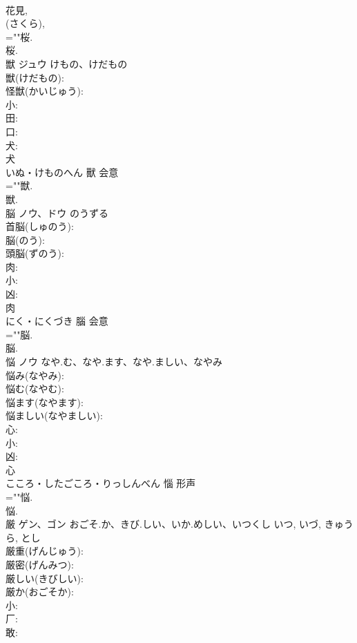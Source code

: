 \documentclass[8pt]{extreport}
\begin{document}
\begin{CJK}{UTF8}{min}
\\	花見, 
\\	(さくら), 
\\	=""桜.
\\	桜.
\\	獣	ジュウ	けもの、けだもの		
\\	獣(けだもの): 
\\	怪獣(かいじゅう): 
\\	小: 
\\	田: 
\\	口: 
\\	犬: 
\\	犬	
\\	いぬ・けものへん	獸	会意 
\\	=""獣.
\\	獣.
\\	脳	ノウ、ドウ	のうずる		
\\	首脳(しゅのう): 
\\	脳(のう): 
\\	頭脳(ずのう): 
\\	肉: 
\\	小: 
\\	凶: 
\\	肉	
\\	にく・にくづき	腦	会意 
\\	=""脳.
\\	脳.
\\	悩	ノウ	なや.む、なや.ます、なや.ましい、なやみ		
\\	悩み(なやみ): 
\\	悩む(なやむ): 
\\	悩ます(なやます): 
\\	悩ましい(なやましい): 
\\	心: 
\\	小: 
\\	凶: 
\\	心	
\\	こころ・したごころ・りっしんべん	惱	形声 
\\	=""悩.
\\	悩.
\\	厳	ゲン、ゴン	おごそ.か、きび.しい、いか.めしい、いつくし	いつ, いづ, きゅうら, とし	
\\	厳重(げんじゅう): 
\\	厳密(げんみつ): 
\\	厳しい(きびしい): 
\\	厳か(おごそか): 
\\	小: 
\\	厂: 
\\	敢: 

\end{CJK}
\end{document}
